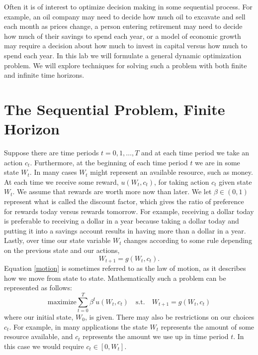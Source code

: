 \newcommand\ve{\varepsilon}

Often it is of interest to optimize decision making in some sequential process.  For example, an oil company may need to decide
how much oil to excavate and sell each month as prices change, a person entering retirement may need to decide how much of their
savings to spend each year, or a model of economic growth may require a decision about how much to invest in capital versus how
much to spend each year.  In this lab we will formulate a general dynamic optimization problem.  We will explore techniques for
solving such a problem with both finite and infinite time horizons.

\section*{The Sequential Problem, Finite Horizon}
Suppose there are time periods $t=0,1,\ldots, T$ and at each time period we take an action $c_t$. Furthermore, at the beginning
of each time period $t$ we are in some state $W_t$.  In many cases $W_t$ might represent an available resource, such as money.
At each time we receive some reward, $u(W_t,c_t)$, for taking action $c_t$ given state $W_t$.  We assume that rewards are worth
more now than later. We let $\beta\in (0,1)$ represent what is called the discount factor, which gives the ratio of preference for
rewards today versus rewards tomorrow.  For example, receiving a dollar today is preferable to receiving a dollar in a year
because taking a dollar today and putting it into a savings account results in having more than a dollar in a year.  Lastly, over
time our state variable $W_t$ changes according to some rule depending on the previous state and our actions,
\begin{equation}
\label{motion}
W_{t+1} = g(W_t,c_t).
\end{equation}
Equation \eqref{motion} is sometimes referred to as the law of motion, as it describes how we move from state to state.
Mathematically such a problem can be represented as follows:
\begin{equation*}
\text{maximize} \sum_{t=0}^T \beta^t u(W_t,c_t) \quad \text{s.t.} \quad W_{t+1} = g(W_t,c_t)
\end{equation*}
where our initial state, $W_0$, is given.  There may also be restrictions on our choices $c_t$.  For example, in many applications
the state $W_t$ represents the amount of some resource available, and $c_t$ represents the amount we use up in time period $t$.
 In this case we would require $c_t \in [0,W_t]$.

